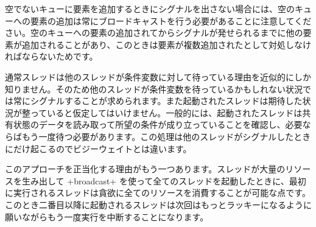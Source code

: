空でないキューに要素を追加するときにシグナルを出さない場合には、空のキューへの要素の追加は常にブロードキャストを行う必要があることに注意してください。空のキューへの要素の追加されてからシグナルが発せられるまでに他の要素が追加されることがあり、このときは要素が複数追加されたとして対処しなければならないためです。

通常スレッドは他のスレッドが条件変数に対して待っている理由を近似的にしか知りません。そのため他のスレッドが条件変数を待っているかもしれない状況では常にシグナルすることが求められます。また起動されたスレッドは期待した状況が整っていると仮定してはいけません。一般的には、起動されたスレッドは共有状態のデータを読み取って所望の条件が成り立っていることを確認し、必要ならばもう一度待つ必要があります。この処理は他のスレッドがシグナルしたときにだけ起こるのでビジーウェイトとは違います。

このアプローチを正当化する理由がもう一つあります。スレッドが大量のリソースを生み出して \ml+broadcast+ を使って全てのスレッドを起動したときに、最初に実行されるスレッドは貪欲に全てのリソースを消費することが可能な点です。このとき二番目以降に起動されるスレッドは次回はもっとラッキーになるように願いながらもう一度実行を中断することになります。

